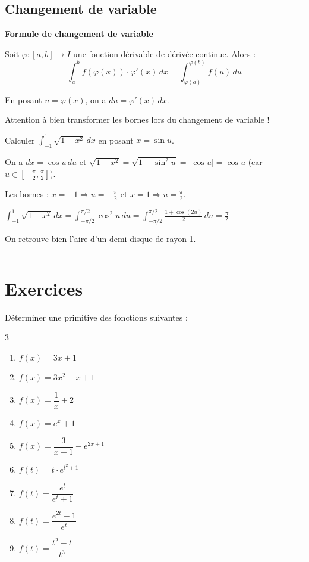 \documentclass[../PolyS2.tex]{subfiles}
\begin{document}
\newpage 

\subsection{Changement de variable}

\begin{Thm}\textbf{Formule de changement de variable}

Soit $\varphi : [a,b] \to I$ une fonction dérivable de dérivée continue. Alors :
$$\int_a^b f(\varphi(x)) \cdot \varphi'(x) \, dx = \int_{\varphi(a)}^{\varphi(b)} f(u) \, du$$

En posant $u = \varphi(x)$, on a $du = \varphi'(x) \, dx$.
\end{Thm}

\begin{Rmq}
Attention à bien transformer les bornes lors du changement de variable !
\end{Rmq}

\begin{Ex}
Calculer $\displaystyle\int_{-1}^{1} \sqrt{1-x^2} \, dx$ en posant $x = \sin u$.

On a $dx = \cos u \, du$ et $\sqrt{1-x^2} = \sqrt{1-\sin^2 u} = |\cos u| = \cos u$ (car $u \in [-\frac{\pi}{2}, \frac{\pi}{2}]$).

Les bornes : $x = -1 \Rightarrow u = -\frac{\pi}{2}$ et $x = 1 \Rightarrow u = \frac{\pi}{2}$.

$\displaystyle\int_{-1}^{1} \sqrt{1-x^2} \, dx = \int_{-\pi/2}^{\pi/2} \cos^2 u \, du = \int_{-\pi/2}^{\pi/2} \frac{1+\cos(2u)}{2} \, du = \frac{\pi}{2}$

On retrouve bien l'aire d'un demi-disque de rayon 1.
\end{Ex}

\vspace{1em}\hrule\vspace{1em}


\section{Exercices}


Déterminer une primitive des fonctions suivantes :

\begin{multicols}{3}
\begin{enumerate}
\item $f(x) = 3x + 1$
\item $f(x) = 3x^2 - x + 1$
\item $f(x) = \dfrac{1}{x} + 2$
\item $f(x) = e^x + 1$
\item $f(x) = \dfrac{3}{x+1} - e^{2x+1}$
\item $f(t) = t \cdot e^{t^2+1}$
\item $f(t) = \dfrac{e^t}{e^t+1}$
\item $f(t) = \dfrac{e^{2t}-1}{e^t}$
\item $f(t) = \dfrac{t^2-t}{t^3}$
\end{enumerate}
\end{multicols}
\end{document}
